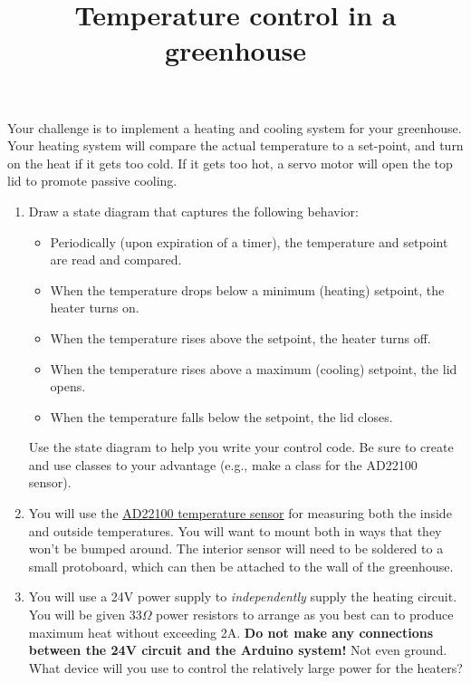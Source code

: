 \documentclass[11pt]{article} %
\title{Temperature control in a greenhouse}
\author{}
\date{} %
\begin{document}
\maketitle


Your challenge is to implement a heating and cooling system for your greenhouse. Your heating system will compare the actual temperature to a set-point, and turn on the heat if it gets too cold. If it gets too hot, a servo motor will open the top lid to promote passive cooling.

\begin{enumerate}
\item Draw a state diagram that captures the following behavior:
\begin{itemize}
\item Periodically (upon expiration of a timer), the temperature and setpoint are read and compared.
\item When the temperature drops below a minimum (heating) setpoint, the heater turns on.
\item When the  temperature rises above the setpoint, the heater turns off.
\item When the temperature rises above a maximum (cooling) setpoint, the lid opens.
\item When the  temperature falls below the setpoint, the lid closes.
\end{itemize}
Use the state diagram to help you write your control code. Be sure to create and use classes to your advantage (e.g., make a class for the AD22100 sensor).
\item You will use the \href{http://www.analog.com/media/en/technical-documentation/data-sheets/AD22100.pdf}{\underline{AD22100 temperature sensor}} for measuring both the inside and outside temperatures. You will want to mount both in ways that they won’t be bumped around. The interior sensor will need to be soldered to a small protoboard, which can then be attached to the wall of the greenhouse.
\item You will use a 24V power supply to \emph{independently} supply the heating circuit. You will be given 33$\Omega$ power resistors to arrange as you best can to produce maximum heat without exceeding 2A. {\bf Do not make any connections between the 24V circuit and the Arduino system!} Not even ground. What device will you use to control the relatively large power for the heaters?

\end{enumerate}
\end{document}
